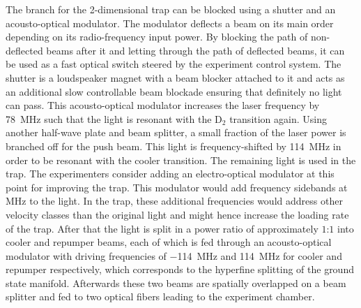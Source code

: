 The branch for the 2-dimensional trap can be blocked using a shutter and an acousto-optical modulator. The modulator deflects a beam on its main order depending on its radio-frequency input power. By blocking the path of non-deflected beams after it and letting through the path of deflected beams, it can be used as a fast optical switch steered by the experiment control system. The shutter is a loudspeaker magnet with a beam blocker attached to it and acts as an additional slow controllable beam blockade ensuring that definitely no light can pass. This acousto-optical modulator increases the laser frequency by \SI{+78}{\mega\hertz} such that the light is resonant with the D$_2$ transition again. Using another half-wave plate and beam splitter, a small fraction of the laser power is branched off for the push beam. This light is frequency-shifted by \SI{+114}{\mega\hertz} in order to be resonant with the cooler transition. The remaining light is used in the trap. The experimenters consider adding an electro-optical modulator at this point for improving the trap. This modulator would add frequency sidebands at \si{\mega\hertz} to the light. In the trap, these additional frequencies would address other velocity classes than the original light and might hence increase the loading rate of the trap.
After that the light is split in a power ratio of approximately $1$:$1$ into cooler and repumper beams, each of which is fed through an acousto-optical modulator with driving frequencies of \SI{-114}{\mega\hertz} and \SI{+114}{\mega\hertz} for cooler and repumper respectively, which corresponds to the hyperfine splitting of the ground state manifold. Afterwards these two beams are spatially overlapped on a beam splitter and fed to two optical fibers leading to the experiment chamber.

